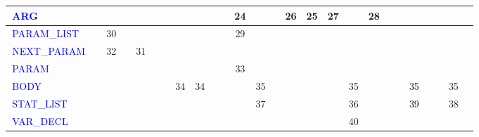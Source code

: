\documentclass[a4paper]{article}
\theoremstyle{definition}
\newcommand{\nter}[1]{\textcolor{blue}{\,#1\,}}
\begin{document}
\begin{center}
{\begin{tabular}{| l || c | c | c | c | c | c | c | c | c | c | c | c | c | c | c | c | c | c | c | c | c | c | c | c | c |}
	\nter{ARG}         &         &         &         &         &         &          &            &           &                &              &     24   &          &               &         26     &      25           &           27      &             &      28   &              &               &              &              &            &             & \\\hline
	\nter{PARAM\_LIST} &         &    30   &         &         &         &          &            &           &                &              &      29  &          &               &                &                   &                   &             &           &              &               &              &              &            &             & \\\hline
	\nter{NEXT\_PARAM} &         &  32     &         &    31   &         &          &            &           &                &              &          &          &               &                &                   &                   &             &           &              &               &              &              &            &             & \\\hline
	\nter{PARAM}       &         &         &         &         &         &          &            &           &                &              &     33   &          &               &                &                   &                   &             &           &              &               &              &              &            &             & \\\hline
	\nter{BODY}        &         &         &         &         &         &          &    34      &     34    &                &              &          &    35    &               &                &                   &                   &      35     &           &              &               &    35        &              &            &      35     & \\\hline
	\nter{STAT\_LIST}  &         &         &         &         &         &          &            &           &                &              &          &    37    &               &                &                   &                   &      36     &           &              &               &      39      &              &            &      38     & \\\hline
	\nter{VAR\_DECL}   &         &         &         &         &         &          &            &           &                &              &          &          &               &                &                   &                   &      40     &           &              &               &              &              &            &             & \\\hline

\end{tabular}}
\end{center}
\end{document}
